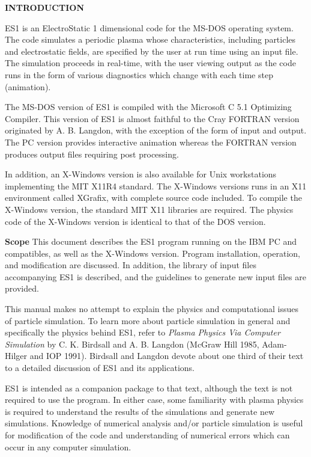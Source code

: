 \newpage
\begin{section}
{\bf INTRODUCTION}

ES1 is an ElectroStatic 1 dimensional code for the MS-DOS operating system.
The code simulates a periodic plasma whose characteristics, including particles
and electrostatic fields, are specified by the user at run time using an input
file.  The simulation proceeds in real-time, with the user viewing output as
the code runs in the form of various diagnostics which change with each time
step (animation).
\vspace{.2in}

\noindent
The MS-DOS version of ES1 is compiled with the Microsoft C 5.1 Optimizing
Compiler.  This version of ES1 is almost faithful to the Cray FORTRAN version
originated by A. B. Langdon, with the exception of the form of input and
output.  The PC version provides interactive animation whereas the FORTRAN
version produces output files requiring post processing.

\noindent
In addition, an X-Windows version is also available for Unix workstations
implementing the MIT X11R4 standard.  The X-Windows versions runs in an X11
environment called XGrafix, with complete source code included.  To compile the
X-Windows version, the standard MIT X11 libraries are required.  The physics
code of the X-Windows version is identical to that of the DOS version.
\begin{subsection}
{\bf Scope}
   This document describes the ES1 program running on the IBM PC and
   compatibles, as well as the X-Windows version.  Program installation,
   operation, and modification are discussed.  In addition, the library of
   input files accompanying ES1 is described, and the guidelines to generate
   new input files are provided.
\vspace{.2in}

\noindent
   This manual makes no attempt to explain the physics and computational issues
   of particle simulation.  To learn more about particle simulation in general
   and specifically the physics behind ES1, refer to {\em Plasma Physics Via
   Computer Simulation} by C. K. Birdsall and A. B. Langdon (McGraw Hill 1985,
   Adam-Hilger and IOP 1991).  Birdsall and Langdon devote about one third of their text
   to a detailed discussion of ES1 and its applications.
\vspace{.2in}

\noindent
   ES1 is intended as a companion package to that text, although the text is
   not required to use the program.  In either case, some familiarity with
   plasma physics is required to understand the results of the simulations and
   generate new simulations.  Knowledge of numerical analysis and/or particle
   simulation is useful for modification of the code and understanding of
   numerical errors which can occur in any computer simulation.
\end{subsection}


\end{section}
